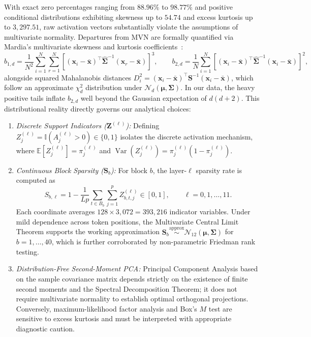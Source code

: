 \documentclass[12pt, a4paper, oneside]{report}
\theoremstyle{definition}
\newcommand{\vect}[1]{\mathbf{#1}}
\newcommand{\mat}[1]{\mathbf{#1}}
\newcommand{\E}{\mathbb{E}}
\newcommand{\Var}{\operatorname{Var}}
\newcommand{\Ind}{\mathbb{I}}
\begin{document}
With exact zero percentages ranging from $88.96\%$ to $98.77\%$ and positive conditional distributions exhibiting skewness up to $54.74$ and excess kurtosis up to $3{,}297.51$, raw activation vectors substantially violate the assumptions of multivariate normality. Departures from MVN are formally quantified via Mardia's multivariate skewness and kurtosis coefficients~\cite{mardia1970measures}:
\begin{equation}
    b_{1,d} = \frac{1}{N^2}\sum_{i=1}^{N}\sum_{r=1}^{N} \left[(\vect{x}_i - \bar{\vect{x}})^\top \hat{\mat{\Sigma}}^{-1} (\vect{x}_r - \bar{\vect{x}})\right]^3,
    \qquad
    b_{2,d} = \frac{1}{N}\sum_{i=1}^{N} \left[(\vect{x}_i - \bar{\vect{x}})^\top \hat{\mat{\Sigma}}^{-1} (\vect{x}_i - \bar{\vect{x}})\right]^2,
    \label{eq:mardia}
\end{equation}
alongside squared Mahalanobis distances $D_i^2 = (\vect{x}_i - \bar{\vect{x}})^\top \mat{S}^{-1} (\vect{x}_i - \bar{\vect{x}})$, which follow an approximate $\chi^2_d$ distribution under $\mathcal{N}_d(\boldsymbol{\mu}, \mat{\Sigma})$. In our data, the heavy positive tails inflate $b_{2,d}$ well beyond the Gaussian expectation of $d(d+2)$. This distributional reality directly governs our analytical choices:
\begin{enumerate}
    \item \emph{Discrete Support Indicators ($\vect{Z}^{(\ell)}$):} Defining $Z_j^{(\ell)} = \Ind(A_j^{(\ell)} > 0) \in \{0, 1\}$ isolates the discrete activation mechanism, where $\E[Z_j^{(\ell)}] = \pi_j^{(\ell)}$ and $\Var(Z_j^{(\ell)}) = \pi_j^{(\ell)}(1 - \pi_j^{(\ell)})$.
    \item \emph{Continuous Block Sparsity ($\vect{S}_b$):} For block $b$, the layer-$\ell$ sparsity rate is computed as
    \begin{equation}
        S_{b,\ell} = 1 - \frac{1}{L p}\sum_{t \in B_b}\sum_{j=1}^{p} Z_{b,t,j}^{(\ell)} \in [0, 1],
        \qquad \ell = 0, 1, \dots, 11.
        \label{eq:block_sparsity_def}
    \end{equation}
    Each coordinate averages $128 \times 3{,}072 = 393{,}216$ indicator variables. Under mild dependence across token positions, the Multivariate Central Limit Theorem supports the working approximation $\vect{S}_b \stackrel{\text{approx}}{\sim} \mathcal{N}_{12}(\boldsymbol{\mu}, \mat{\Sigma})$ for $b = 1, \dots, 40$, which is further corroborated by non-parametric Friedman rank testing.
    \item \emph{Distribution-Free Second-Moment PCA:} Principal Component Analysis based on the sample covariance matrix depends strictly on the existence of finite second moments and the Spectral Decomposition Theorem; it does not require multivariate normality to establish optimal orthogonal projections. Conversely, maximum-likelihood factor analysis and Box's $M$ test are sensitive to excess kurtosis and must be interpreted with appropriate diagnostic caution.
\end{enumerate}
\end{document}
